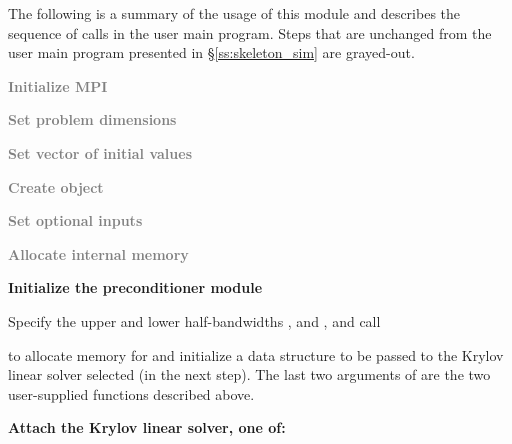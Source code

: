 The following is a summary of the usage of this module and describes the sequence
of calls in the user main program. Steps that are unchanged from the user main
program presented in \S\ref{ss:skeleton_sim} are grayed-out.
\begin{Steps}
\item 
  \textcolor{gray}{\bf Initialize MPI}

\item
  \textcolor{gray}{\bf Set problem dimensions}

\item
  \textcolor{gray}{\bf Set vector of initial values}
 
\item
  \textcolor{gray}{\bf Create {\cvode} object}

\item
  \textcolor{gray}{\bf Set optional inputs}

\item
  \textcolor{gray}{\bf Allocate internal memory}

\item \label{i:bbdpre_init}
  {\bf Initialize the {\cvbbdpre} preconditioner module}

  Specify the upper and lower half-bandwidths ,  and
  ,  and call 


  to allocate memory for and initialize a data structure  to be 
  passed to the Krylov linear solver selected (in the next step). The last two
  arguments of  are the two user-supplied functions described
  above.

\item \label{i:bbdpre_attach}
  {\bf Attach the Krylov linear solver, one of:}





\end{Steps}
